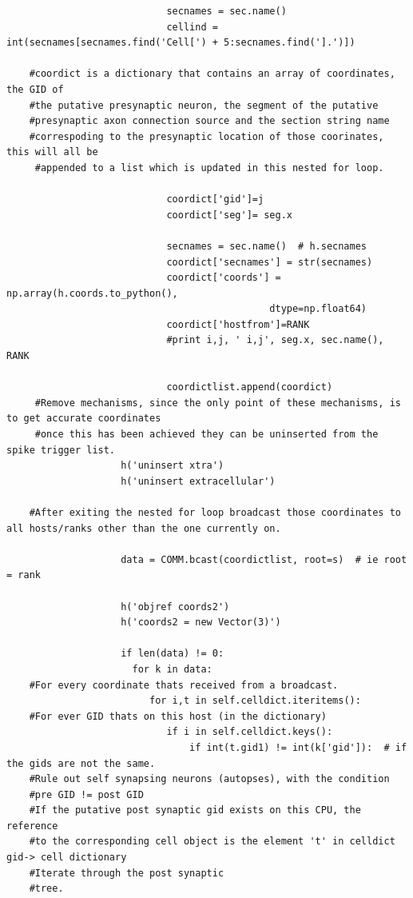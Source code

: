 \documentclass[a4paper,11pt]{article}
\begin{document}
\begin{verbatim}
                            secnames = sec.name()
                            cellind = int(secnames[secnames.find('Cell[') + 5:secnames.find('].')])

	#coordict is a dictionary that contains an array of coordinates, the GID of 
	#the putative presynaptic neuron, the segment of the putative 
	#presynaptic axon connection source and the section string name 
	#correspoding to the presynaptic location of those coorinates, this will all be
     #appended to a list which is updated in this nested for loop.
     
                            coordict['gid']=j 
                            coordict['seg']= seg.x
                            
                            secnames = sec.name()  # h.secnames                            
                            coordict['secnames'] = str(secnames)
                            coordict['coords'] = np.array(h.coords.to_python(),
                                              dtype=np.float64)
                            coordict['hostfrom']=RANK                  
                            #print i,j, ' i,j', seg.x, sec.name(), RANK
                                                
                            coordictlist.append(coordict)                  
     #Remove mechanisms, since the only point of these mechanisms, is to get accurate coordinates
     #once this has been achieved they can be uninserted from the spike trigger list.
                    h('uninsert xtra')
                    h('uninsert extracellular')
  
  	#After exiting the nested for loop broadcast those coordinates to all hosts/ranks other than the one currently on.           

                    data = COMM.bcast(coordictlist, root=s)  # ie root = rank
                                
                    h('objref coords2') 
                    h('coords2 = new Vector(3)')
             
                    if len(data) != 0:
                      for k in data:
    #For every coordinate thats received from a broadcast.
                         for i,t in self.celldict.iteritems():
    #For ever GID thats on this host (in the dictionary)                                                                               
                            if i in self.celldict.keys():
                                if int(t.gid1) != int(k['gid']):  # if the gids are not the same.
    #Rule out self synapsing neurons (autopses), with the condition 
    #pre GID != post GID 
    #If the putative post synaptic gid exists on this CPU, the reference 
    #to the corresponding cell object is the element 't' in celldict gid-> cell dictionary
    #Iterate through the post synaptic 
    #tree.                    
                            

\end{verbatim}
\end{document}
